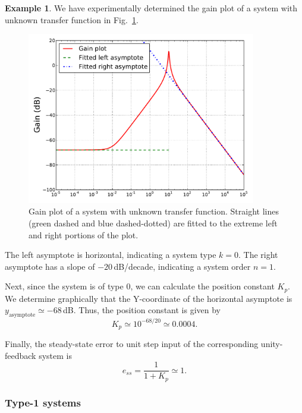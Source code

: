 \documentclass[a4paper,11pt]{report}
\theoremstyle{definition}
\newtheorem{mdexample}{Example}
\newenvironment{example}%
  {\vspace{0.1cm}\begin{mdframed}[backgroundcolor=lightgray]\begin{mdexample}}%
  {\end{mdexample}\end{mdframed}\vspace{0.1cm}}
\begin{document}
\begin{example}
  \label{ex:bode-type0}
  We have experimentally determined the gain plot of a system with
  unknown transfer function in Fig.~\ref{fig:bode-type0}.
  \begin{figure}[H]
    \centering
    \includegraphics[width=10cm]{fig/bode-type0.pdf}
    \caption{Gain plot of a system with unknown transfer
      function. Straight lines (green dashed and blue dashed-dotted)
      are fitted to the extreme left and right portions of the plot.}
    \label{fig:bode-type0}
  \end{figure}

  The left asymptote is horizontal, indicating a system type
  $k=0$. The right asymptote has a slope of $-20$\,dB/decade,
  indicating a system order $n=1$.

  Next, since the system is of type 0, we can calculate the position
  constant $K_p$. We determine graphically that the Y-coordinate of
  the horizontal asymptote is $y_\mathrm{asymptote}\simeq
  -68$\,dB. Thus, the position constant is given by
  \[
  K_p \simeq 10^{-68/20}  \simeq 0.0004.
  \]

  Finally, the steady-state error to unit step input of the
  corresponding unity-feedback system is
  \[
  e_{ss} = \frac{1}{1+K_p} \simeq 1.
  \]


\end{example}

\subsubsection{Type-1 systems}
\end{document}
